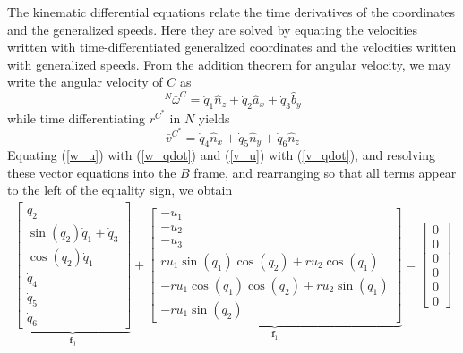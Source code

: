 \documentclass[smallcondensed,final]{svjour3}                     %
\begin{document}
The kinematic differential equations relate the time derivatives of the
coordinates and the generalized speeds. Here they are solved by equating the
velocities written with time-differentiated generalized coordinates and the
velocities written with generalized speeds.  From the addition theorem for
angular velocity, we may write the angular velocity of $C$ as
\begin{equation}
  \label{w_qdot}
  {^N}\bar{\omega}^C = \dot{q}_1 \hat{n}_z + \dot{q}_2 \hat{a}_x + \dot{q}_3 \hat{b}_y
\end{equation}
while time differentiating $r^{C^*}$ in $N$ yields
\begin{equation}
  \label{v_qdot}
  \bar{v}^{C^*} = \dot{q}_4 \hat{n}_x + \dot{q}_5 \hat{n}_y + \dot{q}_6 \hat{n}_z
\end{equation}
Equating (\ref{w_u}) with (\ref{w_qdot}) and (\ref{v_u}) with (\ref{v_qdot}),
and resolving these vector equations into the $B$ frame, and rearranging so
that all terms appear to the left of the equality sign, we obtain
\begin{align}
    \label{rd:f_0_f_1}
\underbrace{\left[\begin{matrix}\dot{q}_{2}\\\sin\left(q_{2}\right)
    \dot{q}_{1} + \dot{q}_{3}\\\cos\left(q_{2}\right)
    \dot{q}_{1}\\\dot{q}_{4}\\\dot{q}_{5}\\\dot{q}_{6}\end{matrix}\right]}_{\mathbf{f}_0}
    + 
\underbrace{\left[\begin{matrix}- u_{1}\\- u_{2}\\- u_{3}\\r u_{1}
    \sin\left(q_{1}\right) \cos\left(q_{2}\right) +
    r u_{2} \cos\left(q_{1}\right)\\- r u_{1}
    \cos\left(q_{1}\right) \cos\left(q_{2}\right) +
    r u_{2} \sin\left(q_{1}\right)\\- r u_{1}
    \sin\left(q_{2}\right)\end{matrix}\right]}_{\mathbf{f}_1}
    = \left[\begin{matrix} 0\\ 0\\ 0\\ 0\\ 0\\ 0\end{matrix}\right]
\end{align}
\end{document}
